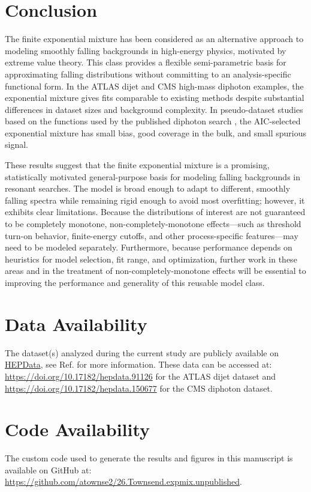 \documentclass[a4paper,11pt]{article}
\begin{document}
\section{Conclusion} \label{sec:conclusion}

The finite exponential mixture has been considered as an alternative approach to modeling 
smoothly falling backgrounds in high-energy physics, motivated by extreme value theory.
This class provides a flexible semi-parametric basis for approximating falling distributions 
without committing to an analysis-specific functional form. In the ATLAS dijet and CMS 
high-mass diphoton examples, the exponential mixture gives fits comparable to existing methods despite substantial differences in dataset sizes and background complexity.
In pseudo-dataset studies based on the functions used by the published diphoton search \cite{CMS_high_mass_diphoton}, the AIC-selected exponential mixture has small bias, good coverage in the bulk, and small spurious signal.

These results suggest that the finite exponential mixture is a promising, statistically motivated general-purpose basis for modeling falling backgrounds in resonant searches. The model is broad enough to adapt to different, smoothly falling spectra while remaining rigid enough to avoid most overfitting; however, it exhibits clear limitations. Because the distributions of interest are not guaranteed to be completely monotone, non-completely-monotone effects—such as threshold turn-on behavior, finite-energy cutoffs, and other process-specific features—may need to be modeled separately. Furthermore, because performance depends on heuristics for model selection, fit range, and optimization, further work in these areas and in the treatment of non-completely-monotone effects will be essential to improving the performance and generality of this reusable model class.

\section*{Data Availability}
The dataset(s) analyzed during the current study are publicly available on \href{https://www.hepdata.net/}{HEPData}, see Ref. \cite{Maguire_2017} for more information. These data can be accessed at: \url{https://doi.org/10.17182/hepdata.91126} for the ATLAS dijet dataset and \url{https://doi.org/10.17182/hepdata.150677} for the CMS diphoton dataset.

\section*{Code Availability}
The custom code used to generate the results and figures in this manuscript is available on GitHub at: \url{https://github.com/atownse2/26.Townsend.expmix.unpublished}.
\end{document}
